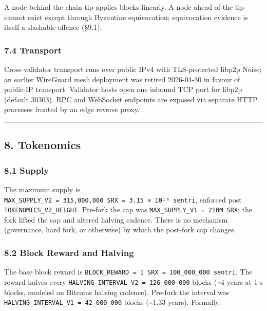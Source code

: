 \documentclass[11pt,a4paper]{article}
\begin{document}
A node behind the chain tip applies blocks linearly. A node ahead of the
tip cannot exist except through Byzantine equivocation; equivocation
evidence is itself a slashable offence (§9.1).

\hypertarget{74-transport}{%
\subsubsection{7.4 Transport}\label{74-transport}}

Cross-validator transport runs over public IPv4 with TLS-protected
libp2p Noise; an earlier WireGuard mesh deployment was retired
2026-04-30 in favour of public-IP transport. Validator hosts open one
inbound TCP port for libp2p (default 30303). RPC and WebSocket endpoints
are exposed via separate HTTP processes fronted by an edge reverse
proxy.

\begin{center}\rule{0.5\linewidth}{0.5pt}\end{center}

\hypertarget{8-tokenomics}{%
\subsection{8. Tokenomics}\label{8-tokenomics}}

\hypertarget{81-supply}{%
\subsubsection{8.1 Supply}\label{81-supply}}

The maximum supply is
\texttt{MAX\_SUPPLY\_V2\ =\ 315,000,000\ SRX\ =\ 3.15\ ×\ 10¹⁶\ sentri},
enforced post \texttt{TOKENOMICS\_V2\_HEIGHT}. Pre-fork the cap was
\texttt{MAX\_SUPPLY\_V1\ =\ 210M\ SRX}; the fork lifted the cap and
altered halving cadence. There is no mechanism (governance, hard fork,
or otherwise) by which the post-fork cap changes.

\hypertarget{82-block-reward-and-halving}{%
\subsubsection{8.2 Block Reward and
Halving}\label{82-block-reward-and-halving}}

The base block reward is
\texttt{BLOCK\_REWARD\ =\ 1\ SRX\ =\ 100\_000\_000\ sentri}. The reward
halves every \texttt{HALVING\_INTERVAL\_V2\ =\ 126\_000\_000} blocks
(\textasciitilde4 years at 1 s blocks, modeled on
Bitcoin\textquotesingle s halving cadence). Pre-fork the interval was
\texttt{HALVING\_INTERVAL\_V1\ =\ 42\_000\_000} blocks
(\textasciitilde1.33 years). Formally:
\end{document}
